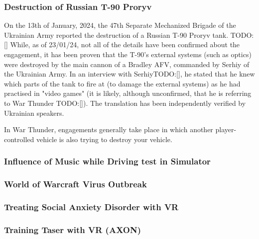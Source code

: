 \documentclass{article}
\begin{document}
\subsubsection{Destruction of Russian T-90 Proryv}

On the 13th of January, 2024, the 47th Separate Mechanized Brigade of the Ukrainian Army reported the destruction of a Russian T-90 Proryv tank. TODO: [] While, as of 23/01/24, not all of the details have been confirmed about the engagement, it has been proven that the T-90's external systems (such as optics) were destroyed by the main cannon of a Bradley AFV, commanded by Serhiy of the Ukrainian Army. In an interview with SerhiyTODO:[], he stated that he knew which parts of the tank to fire at (to damage the external systems) as he had practised in "video games" (it is likely, although unconfirmed, that he is referring to War Thunder TODO:[]). The translation has been independently verified by Ukrainian speakers.

In War Thunder, engagements generally take place in which another player-controlled vehicle is also trying to destroy your vehicle.



\subsubsection{Influence of Music while Driving test in Simulator}


\subsubsection{World of Warcraft Virus Outbreak}

\subsubsection{Treating Social Anxiety Disorder with VR}

\subsubsection{Training Taser with VR (AXON)}
\end{document}
